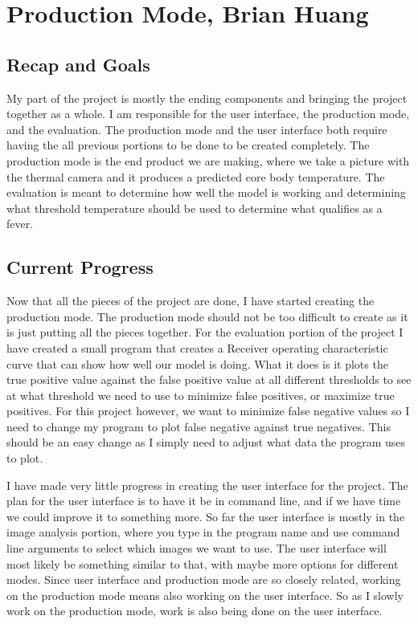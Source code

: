 \documentclass[onecolumn, draftclsnofoot,10pt, compsoc]{IEEEtran}
\begin{document}
\section{Production Mode, Brian Huang}

\subsection{Recap and Goals}
My part of the project is mostly the ending components and bringing the project together as a whole. I am responsible for the user interface, the production mode, and the evaluation. The production mode and the user interface both require having the all previous portions to be done to be created completely. The production mode is the end product we are making, where we take a picture with the thermal camera and it produces a predicted core body temperature. The evaluation is meant to determine how well the model is working and determining what threshold temperature should be used to determine what qualifies as a fever.
\subsection{Current Progress}
Now that all the pieces of the project are done, I have started creating the production mode. The production mode should not be too difficult to create as it is just putting all the pieces together. 
For the evaluation portion of the project I have created a small program that creates a Receiver operating characteristic curve that can show how well our model is doing. What it does is it plots the true positive value against the false positive value at all different thresholds to see at what threshold we need to use to minimize false positives, or maximize true positives. For this project however, we want to minimize false negative values so I need to change my program to plot false negative against true negatives. This should be an easy change as I simply need to adjust what data the program uses to plot.

I have made very little progress in creating the user interface for the project. The plan for the user interface is to have it be in command line, and if we have time we could improve it to something more. So far the user interface is mostly in the image analysis portion, where you type in the program name and use command line arguments to select which images we want to use. The user interface will most likely be something similar to that, with maybe more options for different modes. Since user interface and production mode are so closely related, working on the production mode means also working on the user interface. So as I slowly work on the production mode, work is also being done on the user interface.
\end{document}

